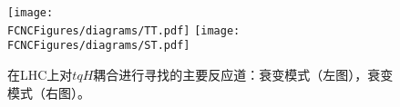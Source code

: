 
\begin{figure}[H]
\centering
\texttt{[image: \\FCNCFigures/diagrams/TT.pdf]}
\texttt{[image: \\FCNCFigures/diagrams/ST.pdf]}\\
\caption{在LHC上对$tqH$耦合进行寻找的主要反应道：衰变模式（左图），衰变模式（右图）。}
\label{fig:diagrams}
\end{figure}